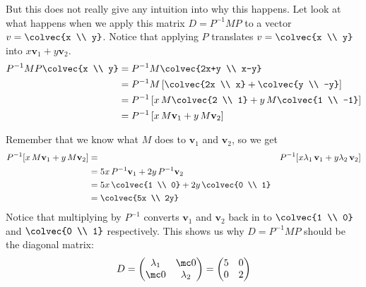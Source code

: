 {But this does not really give any intuition into why this happens. Let look at what happens when we apply this matrix $D = P^{-1}MP$ to a vector $v = \colvec{x \\ y}$. Notice that applying $P$ translates $v = \colvec{x \\ y}$ into $x\mathbf{v}_1+ y\mathbf{v}_2$.
\begin{align*}
P^{-1}MP
\colvec{x \\ y} &= P^{-1}M \colvec{2x+y \\ x-y} \\
&= P^{-1}M \left[\colvec{2x \\ x} + \colvec{y \\ -y}\right] \\
&= P^{-1}\left[ x\, M \colvec{2 \\ 1} + y\,  M\colvec{1 \\ -1}\right]\\
&= P^{-1}\left[ x\, M\mathbf{v}_1 + y\,   M\mathbf{v}_2\right]
\end{align*}

Remember that we know what $M$ does to $\mathbf{v}_1$ and $\mathbf{v}_2$, so we get
\begin{align*}
P^{-1}[ x\, M\mathbf{v}_1 + y\, M\mathbf{v}_2] &=& P^{-1}[ x \lambda_1\,  \mathbf{v}_1 + y \lambda_2 \,  \mathbf{v}_2] \\
&= 5x\,   P^{-1}\mathbf{v}_1 + 2y \,   P^{-1} \mathbf{v}_2 \\
&= 5x\,   \colvec{1 \\ 0} + 2y \,  \colvec{0 \\ 1} \\
&= \colvec{5x \\ 2y}
\end{align*}
Notice that multiplying by $P^{-1}$ converts $\mathbf{v}_1$ and $\mathbf{v}_2$ back in to $ \colvec{1 \\ 0}$ and $ \colvec{0 \\ 1}$ respectively. This shows us why $D = P^{-1}MP$ should be the diagonal matrix:
\[ D = \begin{pmatrix}
\lambda_1 &\mc0\\
\mc0 & \lambda_2
\end{pmatrix}
=\begin{pmatrix}
5 &0\\
0 & 2
\end{pmatrix}
\]
} %

